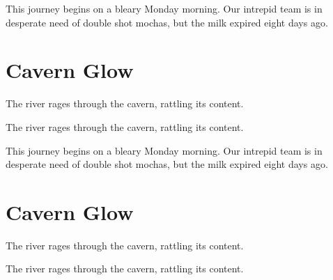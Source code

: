 \begin{preamble}
This journey begins on a bleary Monday morning.
Our intrepid team is in desperate need of double shot mochas, but the milk expired eight days ago.
\end{preamble}
\section*{Cavern Glow}
\hypertarget{_cavern_glow}{The river rages through the cavern, rattling its content.}
The river rages through the cavern, rattling its content.

\begin{preamble}
This journey begins on a bleary Monday morning.
Our intrepid team is in desperate need of double shot mochas, but the milk expired eight days ago.
\end{preamble}
\section*{Cavern Glow}
\hypertarget{_cavern_glow}{The river rages through the cavern, rattling its content.}
The river rages through the cavern, rattling its content.
